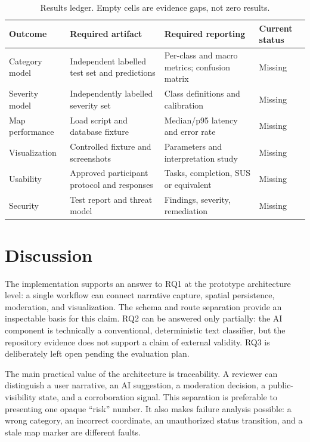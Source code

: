 \documentclass[11pt]{article}
\begin{document}
\begin{table}[H]
\centering
\caption{Results ledger. Empty cells are evidence gaps, not zero results.}
\label{tab:results}
\small
\begin{tabularx}{\textwidth}{p{}p{}p{}X}
\toprule
\textbf{Outcome} & \textbf{Required artifact} & \textbf{Required reporting} & \textbf{Current status}\\
\midrule
Category model & Independent labelled test set and predictions & Per-class and macro metrics; confusion matrix & Missing\\
Severity model & Independently labelled severity set & Class definitions and calibration & Missing\\
Map performance & Load script and database fixture & Median/p95 latency and error rate & Missing\\
Visualization & Controlled fixture and screenshots & Parameters and interpretation study & Missing\\
Usability & Approved participant protocol and responses & Tasks, completion, SUS or equivalent & Missing\\
Security & Test report and threat model & Findings, severity, remediation & Missing\\
\bottomrule
\end{tabularx}
\end{table}

\section{Discussion}
\label{sec:discussion}

The implementation supports an answer to RQ1 at the prototype architecture
level: a single workflow can connect narrative capture, spatial persistence,
moderation, and visualization. The schema and route separation provide an
inspectable basis for this claim. RQ2 can be answered only partially: the
AI component is technically a conventional, deterministic text classifier,
but the repository evidence does not support a claim of external validity.
RQ3 is deliberately left open pending the evaluation plan.

The main practical value of the architecture is traceability. A reviewer can
distinguish a user narrative, an AI suggestion, a moderation decision, a
public-visibility state, and a corroboration signal. This separation is
preferable to presenting one opaque ``risk'' number. It also makes failure
analysis possible: a wrong category, an incorrect coordinate, an
unauthorized status transition, and a stale map marker are different faults.
\end{document}
